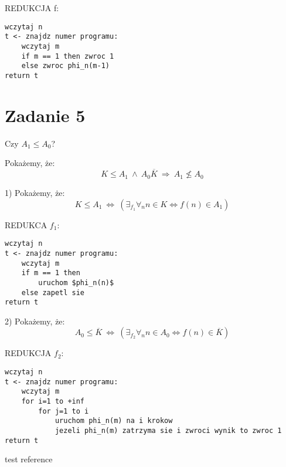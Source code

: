 \documentclass[svgnames]{report}
\begin{document}
REDUKCJA f:
\begin{lstlisting}
wczytaj n
t <- znajdz numer programu:
	wczytaj m
	if m == 1 then zwroc 1
	else zwroc phi_n(m-1)
return t
\end{lstlisting}
	

\section{Zadanie 5}
\begin{framed}
	Czy $A_1 \leqslant A_0$?
\end{framed}

Pokażemy, że:
\begin{equation}
	K \leqslant A_1 \ \wedge \ A_0 \overline{K} \ \Rightarrow \ A_1 \not\leqslant A_0
\end{equation}

1) Pokażemy, że: 
\begin{equation*}
K \leqslant A_1 \ \Leftrightarrow \ (\exists_{f_1} \forall_n n \in K \Leftrightarrow f(n) \in A_1)
\end{equation*}

REDUKCA $f_1$:
\begin{lstlisting}
wczytaj n
t <- znajdz numer programu:
	wczytaj m
	if m == 1 then
		uruchom $phi_n(n)$
	else zapetl sie
return t
\end{lstlisting}

2) Pokażemy, że:
\begin{equation*}
A_0 \leqslant \overline{K} \ \Leftrightarrow \ (\exists_{f_2} \forall_n n \in A_0 \Leftrightarrow f(n) \in \overline{K} )
\end{equation*}

REDUKCJA $f_2$:
\begin{lstlisting}
wczytaj n
t <- znajdz numer programu:
	wczytaj m
	for i=1 to +inf
		for j=1 to i
			uruchom phi_n(m) na i krokow 
			jezeli phi_n(m) zatrzyma sie i zwroci wynik to zwroc 1
return t	
\end{lstlisting}

\begin{thebibliography}{99}
 test reference
\end{thebibliography}
\end{document}
